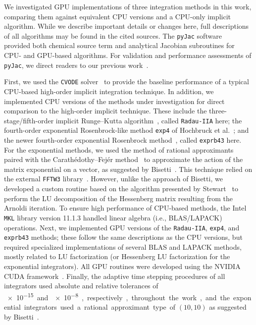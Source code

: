 \documentclass[preprint]{elsarticle}
\begin{document}
We investigated GPU implementations of three integration methods in this work, comparing them against equivalent CPU versions and a CPU-only implicit algorithm.
While we describe important details or changes here, full descriptions of all algorithms may be found in the cited sources.
The \texttt{pyJac} software~\cite{Niemeyer:2015im,Niemeyer:2015ws} provided both chemical source term and analytical Jacobian subroutines for CPU- and GPU-based algorithms.
For validation and performance assessments of \texttt{pyJac}, we direct readers to our previous work~\cite{Niemeyer:2015ws}.

First, we used the \texttt{CVODE} solver~\cite{Hindmarsh:2005hg} to provide the baseline performance of a typical CPU-based high-order implicit integration technique.
In addition, we implemented CPU versions of the methods under investigation for direct comparison to the high-order implicit technique.
These include the three-stage/fifth-order implicit Runge--Kutta algorithm~\cite{wanner1991solving}, called \texttt{Radau-IIA} here; the fourth-order exponential Rosenbrock-like method \texttt{exp4} of Hochbruck et al.~\cite{Hochbruck:1998}; and the newer fourth-order exponential Rosenbrock method~\cite{Hockbruck:2009}, called \texttt{exprb43} here.
For the exponential methods, we used the method of rational approximants~\cite{gallopoulos:1992} paired with the Carath\'edothy--Fej\'er method~\cite{trefethen:2006} to approximate the action of the matrix exponential on a vector, as suggested by Bisetti~\cite{Bisetti:2012jw}.
This technique relied on the external \texttt{FFTW3} library~\cite{frigo2005design}.
However, unlike the approach of Bisetti, we developed a custom routine based on the algorithm presented by Stewart~\cite{stewart:1998} to perform the LU decomposition of the Hessenberg matrix resulting from the Arnoldi iteration.
To ensure high performance of CPU-based methods, the Intel \texttt{MKL} library version 11.1.3 handled linear algebra (i.e., BLAS/LAPACK) operations.
Next, we implemented GPU versions of the \texttt{Radau-IIA}, \texttt{exp4}, and \texttt{exprb43} methods; these follow the same descriptions as the CPU versions, but required specialized implementations of several BLAS and LAPACK methods, mostly related to LU factorization (or Hessenberg LU factorization for the exponential integrators).
All GPU routines were developed using the NVIDIA CUDA framework~\cite{Buck:2008aa,NVIDIA:2015aa}.
Finally, the adaptive time stepping procedures of all integrators used absolute and relative tolerances of \SI{e-15} and \SI{e-8}, respectively, throughout the work, and the exponential integrators used a rational approximant type of $\left(10,10\right)$ as suggested by Bisetti~\cite{Bisetti:2012jw}.
\end{document}
